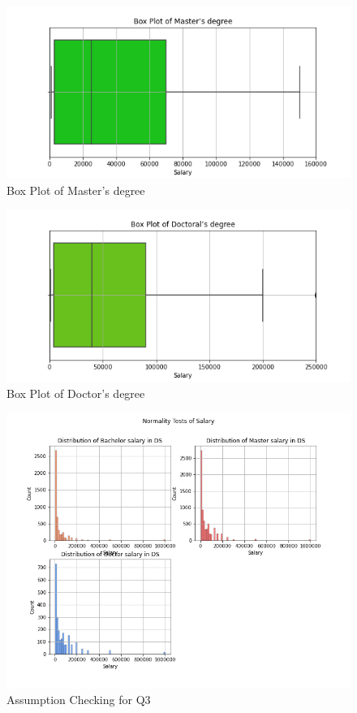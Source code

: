 \documentclass[10pt,onecolumn,letterpaper]{article}
\begin{document}
\begin{figure}[htbp]
  \centering
  \includegraphics[width=.75\textwidth]{f19.png}
  \caption{Box Plot of Master’s degree}
\end{figure}

\begin{figure}[htbp]
  \centering
  \includegraphics[width=.75\textwidth]{f20.png}
  \caption{Box Plot of Doctor’s degree}
\end{figure}

\begin{figure}[htbp]
  \centering
  \includegraphics[width=1\textwidth]{f21.png}
  \caption{Assumption Checking for Q3}
\end{figure}
\end{document}
